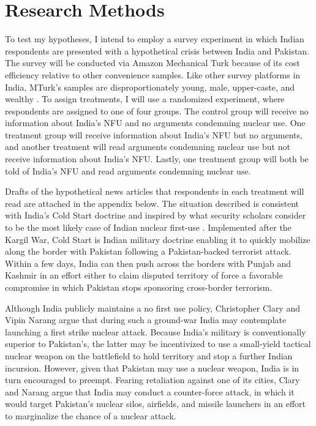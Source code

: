 \documentclass[12pt]{article}
\begin{document}
\section{Research Methods}
To test my hypotheses, I intend to employ a survey experiment in which Indian respondents are presented with a hypothetical crisis between India and Pakistan. The survey will be conducted via Amazon Mechanical Turk because of its cost efficiency relative to other convenience samples. Like other survey platforms in India, MTurk's samples are disproportionately young, male, upper-caste, and wealthy \citep{boas_recruiting_2020}. To assign treatments, I will use a randomized experiment, where respondents are assigned to one of four groups. The control group will receive no information about India's NFU and no arguments condemning nuclear use. One treatment group will receive information about India's NFU but no arguments, and another treatment will read arguments condemning nuclear use but not receive information about India's NFU. Lastly, one treatment group will both be told of India's NFU and read arguments condemning nuclear use.

Drafts of the hypothetical news articles that respondents in each treatment will read are attached in the appendix below. The situation described is consistent with India's Cold Start doctrine and inspired by what security scholars consider to be the most likely case of Indian nuclear first-use \citep{kapur_ten_2008, clary_indias_2019}. Implemented after the Kargil War, Cold Start is Indian military doctrine enabling it to quickly mobilize along the border with Pakistan following a Pakistan-backed terrorist attack. Within a few days, India can then push across the borders with Punjab and Kashmir in an effort either to claim disputed territory of force a favorable compromise in which Pakistan stops sponsoring cross-border terrorism. 

Although India publicly maintains a no first use policy, Christopher Clary and Vipin Narang argue that during such a ground-war India may contemplate launching a first strike nuclear attack. Because India's military is conventionally superior to Pakistan's, the latter may be incentivized to use a small-yield tactical nuclear weapon on the battlefield to hold territory and stop a further Indian incursion. However, given that Pakistan may use a nuclear weapon, India is in turn encouraged to preempt. Fearing retaliation against one of its cities, Clary and Narang argue that India may conduct a counter-force attack, in which it would target Pakistan's nuclear silos, airfields, and missile launchers in an effort to marginalize the chance of a nuclear attack. 
\end{document}
